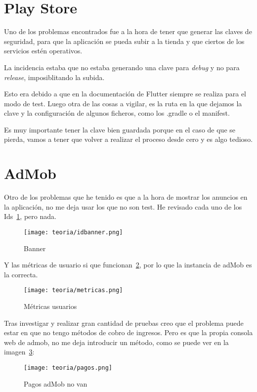 \section{Play Store}
Uno de los problemas encontrados fue a la hora de tener que generar las claves de seguridad, para que la aplicación se pueda subir a la tienda y que ciertos de los servicios estén operativos.

La incidencia estaba que no estaba generando una clave para \emph{debug} y no para \emph{release}, imposiblitando la subida.

Esto era debido a que en la documentación de Flutter siempre se realiza para el modo de test. Luego otra de las cosas a vigilar, es la ruta en la que dejamos la clave y la configuración de algunos ficheros, como los .gradle o el manifest.

Es muy importante tener la clave bien guardada porque en el caso de que se pierda, vamos a tener que volver a realizar el proceso desde cero y es algo tedioso.

\section{AdMob}
Otro de los problemas que he tenido es que a la hora de mostrar los anuncios en la aplicación, no me deja usar los que no son test. He revisado cada uno de los Ids~\ref{fig:idbanner}, pero nada.

\begin{figure}[H]
	\centering
	\texttt{[image: teoria/idbanner.png]}
	\caption{Banner}\label{fig:idbanner}
\end{figure}

Y las métricas de usuario si que funcionan~\ref{fig:metricas}, por lo que la instancia de adMob es la correcta.

\begin{figure}[H]
	\centering
	\texttt{[image: teoria/metricas.png]}
	\caption{Métricas usuarios}\label{fig:metricas}
\end{figure}

Tras investigar y realizar gran cantidad de pruebas creo que el problema puede estar en que no tengo métodos de cobro de ingresos. Pero es que la propia consola web de admob, no me deja introducir un método, como se puede ver en la imagen~\ref{fig:pagos}:

\begin{figure}[H]
	\centering
	\texttt{[image: teoria/pagos.png]}
	\caption{Pagos adMob no van}\label{fig:pagos}
\end{figure}